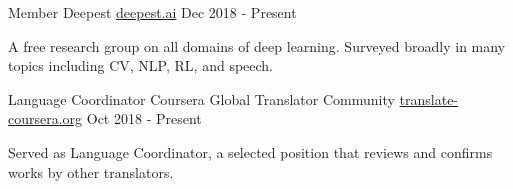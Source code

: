 

\begin{cventries}

  \cventry
    {Member} %
    {Deepest} %
    {\url{deepest.ai}} %
    {Dec 2018 - Present} %
    {
      \begin{cvitems} %
        \item {A free research group on all domains of deep learning. Surveyed broadly in many topics including CV, NLP, RL, and speech.}
      \end{cvitems}
    }

  \cventry
    {Language Coordinator} %
    {Coursera Global Translator Community} %
    {\url{translate-coursera.org}} %
    {Oct 2018 - Present} %
    {
      \begin{cvitems} %
        \item {Served as Language Coordinator, a selected position that reviews and confirms works by other translators.}
      \end{cvitems}
    }

\end{cventries}
